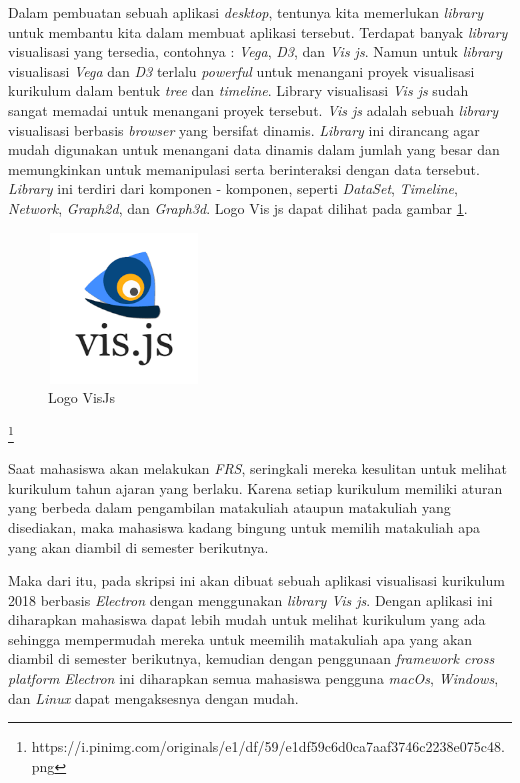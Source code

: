 Dalam pembuatan sebuah aplikasi \textit{desktop}, tentunya kita memerlukan \textit{library} untuk membantu kita dalam membuat aplikasi tersebut. Terdapat banyak \textit{library} visualisasi yang tersedia, contohnya : \textit{Vega}, \textit{D3}, dan \textit{Vis js}. Namun untuk \textit{library} visualisasi \textit{Vega} dan \textit{D3} terlalu \textit{powerful} untuk menangani proyek visualisasi kurikulum dalam bentuk \textit{tree} dan \textit{timeline}. Library visualisasi \textit{Vis js} sudah sangat memadai untuk menangani proyek tersebut. \textit{Vis js} adalah sebuah \textit{library} visualisasi berbasis \textit{browser} yang bersifat dinamis. \textit{Library} ini dirancang agar mudah digunakan untuk menangani data dinamis dalam jumlah yang besar dan memungkinkan untuk memanipulasi serta berinteraksi dengan data tersebut. \textit{Library} ini terdiri dari komponen - komponen, seperti \textit{DataSet}, \textit{Timeline}, \textit{Network}, \textit{Graph2d}, dan \textit{Graph3d}. Logo Vis js dapat dilihat pada gambar \ref{fig:gambar2}.

\begin{figure} [H]
    \centering
    \includegraphics[width=4cm, height=4cm]{Gambar/visJs.png}
    \caption{Logo VisJs}
    \label{fig:gambar2}
\end{figure}

\footnote{https://i.pinimg.com/originals/e1/df/59/e1df59c6d0ca7aaf3746c2238e075c48.png}

Saat mahasiswa akan melakukan \textit{FRS}, seringkali mereka kesulitan untuk melihat kurikulum tahun ajaran yang berlaku. Karena setiap kurikulum memiliki aturan yang berbeda dalam pengambilan matakuliah ataupun matakuliah yang disediakan, maka mahasiswa kadang bingung untuk memilih matakuliah apa yang akan diambil di semester berikutnya.

Maka dari itu, pada skripsi ini akan dibuat sebuah aplikasi visualisasi kurikulum 2018 berbasis \textit{Electron} dengan menggunakan \textit{library Vis js}. Dengan aplikasi ini diharapkan mahasiswa dapat lebih mudah untuk melihat kurikulum yang ada sehingga mempermudah mereka untuk meemilih matakuliah apa yang akan diambil di semester berikutnya, kemudian dengan penggunaan \textit{framework cross platform Electron} ini diharapkan semua mahasiswa pengguna \textit{macOs}, \textit{Windows}, dan \textit{Linux} dapat mengaksesnya dengan mudah.


